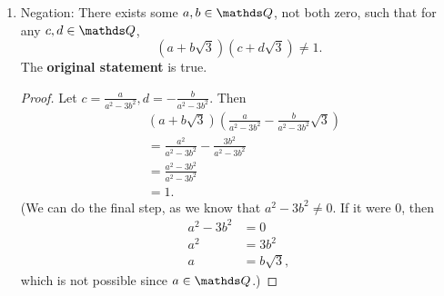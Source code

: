 \documentclass{review-sheet}
\begin{document}
\begin{solution}
\begin{enumerate}[label=(\alph*)]
    \item Negation: There exists some $a,b\in \Q$, not both zero, such that for any $c,d\in \Q$, \[
        \left( a+b\sqrt{3}  \right) \left( c+d\sqrt{3}  \right)  \neq 1
    .\] The \textbf{original statement} is true.
    \begin{proof}[Proof]
      Let $c=\frac{a}{a^2-3b^2}, d=-\frac{b}{a^2-3b^2}$. Then
      \begin{align*}
        &\left( a+b\sqrt{3}  \right) \left( \frac{a}{a^2-3b^2}-\frac{b}{a^2-3b^2}\sqrt{3}  \right)\\
        &= \frac{a^2}{a^2-3b^2} -\frac{3b^2}{a^2-3b^2}\\
        &=\frac{a^2-3b^2}{a^2-3b^2}\\
        &=1
      .\end{align*} (We can do the final step, as we know that $a^2-3b^2\neq 0$. If it were $0$,
      then
      \begin{align*}
        a^2-3b^2&= 0 \\
        a^2&= 3b^2 \\
        a&=b\sqrt{3} 
      ,\end{align*} which is not possible since $a\in \Q$.)
    \end{proof}
    
      
  \end{enumerate}
\end{solution}
\end{document}
